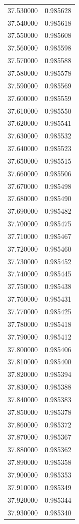 \begin{tabular}{rr}
37.530000 & 0.985628 \\
37.540000 & 0.985618 \\
37.550000 & 0.985608 \\
37.560000 & 0.985598 \\
37.570000 & 0.985588 \\
37.580000 & 0.985578 \\
37.590000 & 0.985569 \\
37.600000 & 0.985559 \\
37.610000 & 0.985550 \\
37.620000 & 0.985541 \\
37.630000 & 0.985532 \\
37.640000 & 0.985523 \\
37.650000 & 0.985515 \\
37.660000 & 0.985506 \\
37.670000 & 0.985498 \\
37.680000 & 0.985490 \\
37.690000 & 0.985482 \\
37.700000 & 0.985475 \\
37.710000 & 0.985467 \\
37.720000 & 0.985460 \\
37.730000 & 0.985452 \\
37.740000 & 0.985445 \\
37.750000 & 0.985438 \\
37.760000 & 0.985431 \\
37.770000 & 0.985425 \\
37.780000 & 0.985418 \\
37.790000 & 0.985412 \\
37.800000 & 0.985406 \\
37.810000 & 0.985400 \\
37.820000 & 0.985394 \\
37.830000 & 0.985388 \\
37.840000 & 0.985383 \\
37.850000 & 0.985378 \\
37.860000 & 0.985372 \\
37.870000 & 0.985367 \\
37.880000 & 0.985362 \\
37.890000 & 0.985358 \\
37.900000 & 0.985353 \\
37.910000 & 0.985349 \\
37.920000 & 0.985344 \\
37.930000 & 0.985340 \\

\end{tabular}
